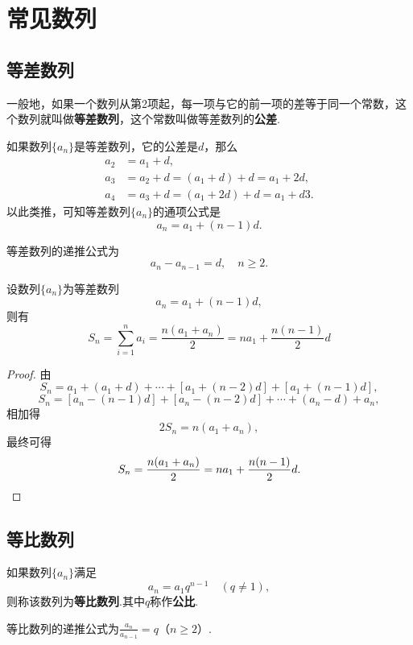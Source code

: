 \section{常见数列}
\subsection{等差数列}
\begin{definition}
一般地，如果一个数列从第2项起，每一项与它的前一项的差等于同一个常数，这个数列就叫做\textbf{等差数列}，这个常数叫做等差数列的\textbf{公差}.
\end{definition}

如果数列\(\{a_n\}\)是等差数列，它的公差是\(d\)，那么\begin{align*}
a_2 &= a_1 + d, \\
a_3 &= a_2 + d = (a_1 + d) + d = a_1 + 2d, \\
a_4 &= a_3 + d = (a_1 + 2d) + d = a_1 + d3.
\end{align*}以此类推，可知等差数列\(\{a_n\}\)的通项公式是\[
a_n = a_1 + (n-1) d.
\]

等差数列的递推公式为\[
a_n - a_{n-1} = d, \quad n \geqslant 2.
\]

\begin{property}[等差数列求和]
设数列\(\{a_n\}\)为等差数列\[
a_n = a_1 + (n-1) d,
\]则有\[
S_n = \sum\limits_{i=1}^n a_i
= \frac{n(a_1 + a_n)}{2}
= n a_1 + \frac{n(n-1)}{2} d
\]
\begin{proof}
由\[
S_n = a_1 + (a_1 + d) + \dotsb + [a_1 + (n-2)d] + [a_1 + (n-1)d],
\]\[
S_n = [a_n - (n-1)d] + [a_n - (n-2)d] + \dotsb + (a_n - d) + a_n,
\]相加得\[
2 S_n = n(a_1 + a_n),
\]最终可得\[
S_n = \frac{n(a_1 + a_n)}{2} = n a_1 + \frac{n(n-1)}{2} d.
\qedhere
\]
\end{proof}
\end{property}

\subsection{等比数列}
\begin{definition}
如果数列\(\{a_n\}\)满足\[
a_n = a_1 q^{n-1} \quad(q\neq1),
\]则称该数列为\textbf{等比数列}.其中\(q\)称作\textbf{公比}.

等比数列的递推公式为\(\frac{a_n}{a_{n-1}} = q\)（\(n \geqslant 2\)）.
\end{definition}

